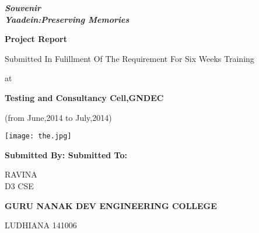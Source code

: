 \documentclass[12pt]{article}
\begin{document}
    \begin{center}
    {\textit{\bfseries\huge{Souvenir}}}\\
     \vspace*{1\baselineskip}
       {\itshape\bfseries\huge{Yaadein:Preserving Memories}}
    \vspace*{2\baselineskip}
     
    {\bfseries \Large{Project Report}}
     
    \vspace*{1\baselineskip}
    Submitted In Fulillment Of The Requirement For Six Weeks Training
     
    at
     
    {\bfseries Testing and Consultancy Cell,GNDEC
     
    (from June,2014 to July,2014)}
     
    \vspace*{2\baselineskip}
    \texttt{[image: the.jpg]}
    \vspace*{3\baselineskip}
    \end{center}
    {\bfseries {\large Submitted By: \hfill Submitted To:}}
    \vspace{00.2cm}
     
                   RAVINA\\
     
                   D3 CSE\\
     
    \begin{center}
    \vspace*{1\baselineskip}
    {\bfseries  
    GURU NANAK DEV ENGINEERING COLLEGE
      
   LUDHIANA 141006
    }
    \end{center}
    
\end{document}
